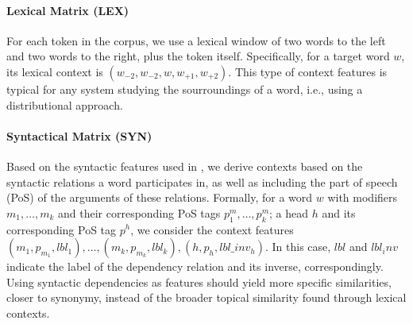 \documentclass{llncs}
\begin{document}
\paragraph{Lexical Matrix (LEX)}
For each token in the corpus, we use a lexical window of two words to the left and two words to the right, plus the token itself. Specifically, for a target word $w$, its lexical context is $(w_{-2}, w_{-2}, w, w_{+1}, w_{+2})$. This type of context features is typical for any system studying the sourroundings of a word, i.e., using a distributional approach.

\paragraph{Syntactical Matrix (SYN)}
Based on the syntactic features used in   \cite{LevyG14,Panchenko2017}, we derive contexts based on the syntactic relations a word participates in, as well as including the part of speech (PoS) of the arguments of these relations. Formally, for a word $w$ with modifiers $m_1, \dots, m_k$ and their corresponding PoS tags $p^m_1, \dots, p^m_k$; a head $h$ and its corresponding PoS tag $p^h$, we consider the context features $(m_1, p_{m_1}, lbl_1), \dots, \allowbreak (m_k, p_{m_k}, lbl_k), \allowbreak (h,p_h,lbl\_inv_h)$. In this case, $lbl$ and $lbl_inv$ indicate the label of the dependency relation and its inverse, correspondingly. Using syntactic dependencies as features should yield more specific similarities, closer to synonymy, instead of the broader topical similarity found through lexical contexts.
\end{document}
